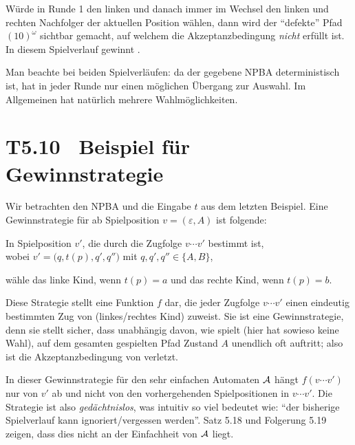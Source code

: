 \documentclass[fontsize=11pt, twoside=false, numbers=autoenddot]{scrbook}
\begin{document}
Würde \PF in Runde 1 den linken und danach immer im Wechsel den linken und rechten
Nachfolger der aktuellen Position wählen, dann wird der "`defekte"' Pfad $(10)^\omega$
sichtbar gemacht, auf welchem die Akzeptanzbedingung \emph{nicht} erfüllt ist.
In diesem Spielverlauf gewinnt \PF.

Man beachte bei beiden Spielverläufen: da der gegebene NPBA deterministisch ist,
hat \AUT in jeder Runde nur einen möglichen Übergang zur Auswahl.
Im Allgemeinen hat \AUT natürlich mehrere Wahlmöglichkeiten.

\goodbreak
\section*{T5.10~ Beispiel für Gewinnstrategie}

Wir betrachten den NPBA \Amc und die Eingabe $t$ aus dem letzten Beispiel.
Eine Gewinnstrategie für \PF ab Spielposition $v = (\varepsilon,A)$ ist folgende:
%
\begin{center}
  \parbox{.8\linewidth}{%
    In Spielposition $v'$, die durch die Zugfolge $v\cdots v'$ bestimmt ist, \\
    wobei $v'=\big(q,t(p),q',q''\big)$ mit $q,q',q'' \in \{A,B\}$,
    \par\smallskip
    wähle das linke Kind, wenn $t(p)=a$ und das rechte Kind, wenn $t(p)=b$. %
  }
\end{center}
%
Diese Strategie stellt eine Funktion $f$ dar, die jeder Zugfolge $v\cdots v'$
einen eindeutig bestimmten Zug von \PF (linkes/rechtes Kind) zuweist.
Sie ist eine Gewinnstrategie, denn sie stellt sicher, dass unabhängig davon, wie \AUT spielt (hier hat \AUT sowieso keine Wahl),
auf dem gesamten gespielten Pfad Zustand $A$ unendlich oft auftritt;
also ist die Akzeptanzbedingung von \Amc verletzt.

\goodbreak
In dieser Gewinnstrategie für den sehr einfachen Automaten $\mathcal{A}$ hängt
$f(v\cdots v')$ nur von $v'$ ab und nicht von den vorhergehenden Spielpositionen
in $v\cdots v'$. Die Strategie ist also \emph{gedächtnislos},
was intuitiv so viel bedeutet wie: "`der bisherige Spielverlauf kann
ignoriert/vergessen werden"'.
Satz 5.18 und Folgerung 5.19 zeigen, dass dies nicht an der
Einfachheit von $\mathcal{A}$ liegt.
\end{document}
